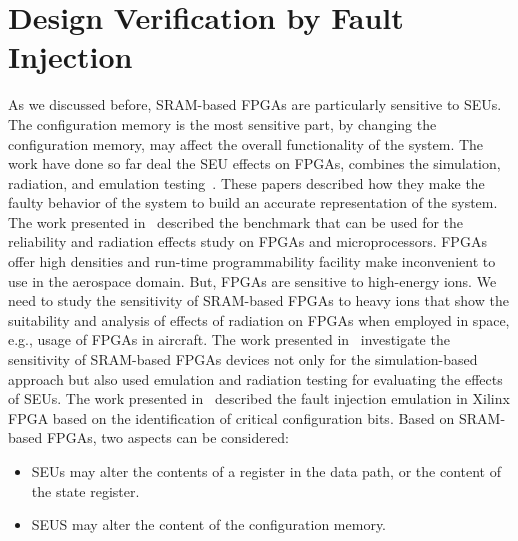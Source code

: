 

\section{Design Verification by Fault Injection}



As we discussed before, SRAM-based FPGAs are particularly sensitive to SEUs. The configuration memory is the most sensitive part, by changing the configuration memory, may affect the overall functionality of the system. The work have done so far deal the SEU effects on FPGAs, combines the simulation, radiation, and emulation testing~\cite{quinn2015validation, violante2004simulation, hobeika2014multi, robache2013methodology, quinn2015using, souari2015optimization}. These papers described how they make the faulty behavior of the system to build an accurate representation of the system. The work presented in~\cite{quinn2015using} described the benchmark that can be used for the reliability and radiation effects study on FPGAs and microprocessors. FPGAs offer high densities and run-time programmability facility make inconvenient to use in the aerospace domain. But, FPGAs are sensitive to high-energy ions.  We need to study the sensitivity of SRAM-based FPGAs to heavy ions that show the suitability and analysis of effects of radiation on FPGAs when employed in space, e.g., usage of FPGAs in aircraft. The work presented in~\cite{hobeika2014multi} investigate the sensitivity of SRAM-based FPGAs devices not only for the simulation-based approach but also used emulation and radiation testing for evaluating the effects of SEUs. The work presented in~\cite{souari2015optimization} described the fault injection emulation in Xilinx FPGA based on the identification of critical configuration bits. Based on SRAM-based FPGAs, two aspects can be considered:

\begin{itemize}


\item SEUs may alter the contents of a register in the data path, or the content of the state register.
\item SEUS may alter the content of the configuration memory.

\end{itemize}



